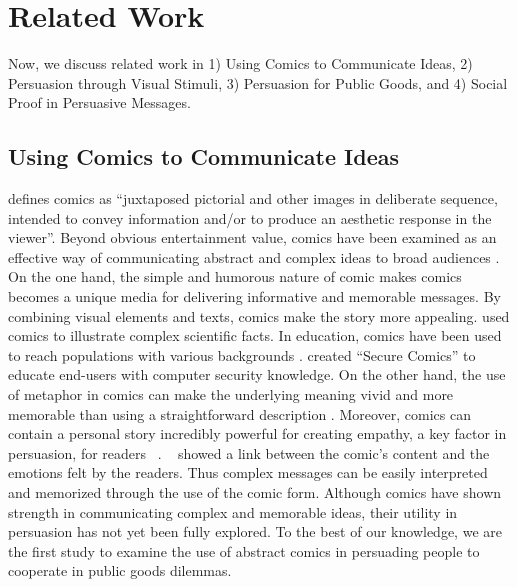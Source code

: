 \section{Related Work}
\label{sec:relatedwork}
Now, we discuss related work in 1) Using Comics to Communicate Ideas, 2) Persuasion through Visual Stimuli, 3) Persuasion for Public Goods, and 4) Social Proof in Persuasive Messages.

\subsection{Using Comics to Communicate Ideas}
\textcite{scott1993understanding} defines comics as ``juxtaposed pictorial and other images in deliberate sequence, intended to convey information and/or to produce an aesthetic response in the viewer''. Beyond obvious entertainment value, comics have been examined as an effective way of communicating abstract and complex ideas to broad audiences \cite{McDermottPB18,cary2004going,scott1993understanding, Zhang-Kennedy:2017:SCI:3206217.3206282}. On the one hand, the simple and humorous nature of comic makes comics becomes a unique media for delivering informative and memorable messages. By combining visual elements and texts, comics make the story more appealing. \textcite{McDermottPB18} used comics to illustrate complex scientific facts. In education, comics have been used to reach populations with various backgrounds \cite{McDermottPB18,cary2004going,scott1993understanding}. \textcite{Zhang-Kennedy:2017:SCI:3206217.3206282} created ``Secure Comics'' to educate end-users with computer security knowledge. On the other hand, the use of metaphor in comics can make the underlying meaning vivid and more memorable than using a straightforward description \cite{McDermottPB18,scott1993understanding}. Moreover, comics can contain a personal story incredibly powerful for creating empathy, a key factor in persuasion, for readers ~\cite{weaver2017losing}. ~\textcite{matsubara2016emotional} showed a link between the comic's content and the emotions felt by the readers. Thus complex messages can be easily interpreted and memorized through the use of the comic form. Although comics have shown strength in communicating complex and memorable ideas, their utility in persuasion has not yet been fully explored. To the best of our knowledge, we are the first study to examine the use of abstract comics in persuading people to cooperate in public goods dilemmas.  


